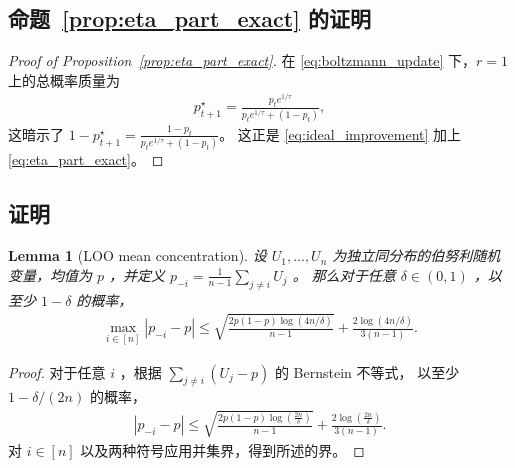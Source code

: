 \documentclass{article}
\theoremstyle{plain}
\newtheorem{lemma}[theorem]{Lemma}
\theoremstyle{definition}
\theoremstyle{remark}
\newcommand{\abs}[1]{\left|#1\right|}
\begin{document}
\subsection{命题~\ref{prop:eta_part_exact} 的证明}\label{sec:proof_eta_part}
\begin{proof}[Proof of Proposition~\ref{prop:eta_part_exact}]
    在 \eqref{eq:boltzmann_update} 下，$r=1$ 上的总概率质量为
    \begin{align*}
        p_{t+1}^\star
        =\frac{p_t e^{1/\tau}}{p_t e^{1/\tau}+(1-p_t)},
    \end{align*}
    这暗示了 $1-p_{t+1}^\star = \frac{1-p_t}{p_t e^{1/\tau}+(1-p_t)}$。  
这正是 \eqref{eq:ideal_improvement} 加上 \eqref{eq:eta_part_exact}。
\end{proof}



\subsection{证明 }
\label{sec:proof_tgt_err_clean}

\begin{lemma}[LOO mean concentration]
\label{lem:loo_mean_bernoulli}
    设 $U_1,\dots,U_n$ 为独立同分布的伯努利随机变量，均值为 $p$ ，并定义 $p_{-i}=\frac{1}{n-1}\sum_{j\neq i}U_j$ 。
    那么对于任意 $\delta\in(0,1)$ ，以至少 $1-\delta$ 的概率，
    \begin{align*}
        \max_{i\in[n]} \abs{p_{-i}-p}
        \leq\sqrt{\frac{2p(1-p)\log(4n/\delta)}{n-1}}+\frac{2\log(4n/\delta)}{3(n-1)}.
    \end{align*}
\end{lemma}
\begin{proof}
    对于任意 $i$ ，根据 $\sum_{j\neq i} (U_j-p)$ 的 Bernstein 不等式，
以至少 $1-\delta/(2n)$ 的概率，
    \begin{align*}
        \abs{p_{-i}-p}
        \leq\sqrt{\frac{2p(1-p)\log(\frac{2n}{\delta})}{n-1}}+\frac{2\log(\frac{2n}{\delta})}{3(n-1)}.
    \end{align*}
    对 $i\in[n]$ 以及两种符号应用并集界，得到所述的界。
\end{proof}
\end{document}
